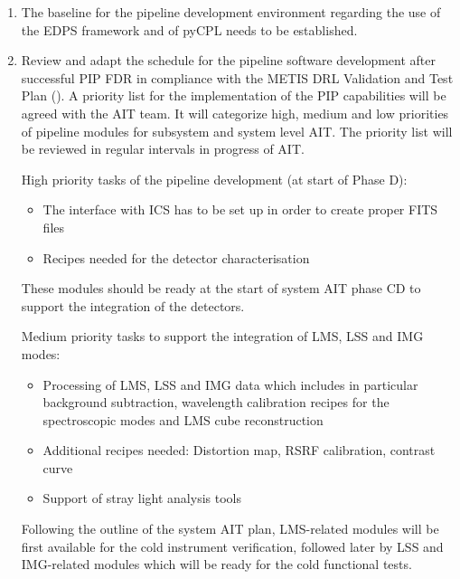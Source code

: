 \begin{enumerate}
    \item The baseline for the pipeline development environment regarding the use of the \ac{EDPS} framework and of pyCPL needs to be established.
    
    \item Review and adapt the schedule for the pipeline software development after successful PIP FDR in compliance with the METIS DRL Validation and Test Plan (\cite{DRLVT}). A priority list for the implementation of the PIP capabilities will be agreed with the AIT team. It will categorize high, medium and low priorities of pipeline modules for subsystem and system level AIT. The priority list will be reviewed in regular intervals in progress of AIT.
   
    High priority tasks of the pipeline development (at start of Phase D): 
    \begin{itemize}
        \item The interface with ICS has to be set up in order to create proper FITS files 
        \item Recipes needed for the detector characterisation
    \end{itemize} 
    These modules should be ready at the start of system AIT phase CD to support the integration of the detectors.
    
    Medium priority tasks to support the integration of \ac{LMS}, \ac{LSS} and \ac{IMG} modes:
    \begin{itemize}
        \item Processing of LMS, LSS and IMG data which includes in particular background subtraction, wavelength calibration recipes for the spectroscopic modes and LMS cube reconstruction
        \item Additional recipes needed: Distortion map, RSRF calibration, contrast curve
        \item Support of stray light analysis tools
    \end{itemize}
    Following the outline of the system AIT plan, LMS-related modules will be first available for the cold instrument verification, followed later by LSS and IMG-related modules which will be ready for the cold functional tests.


\end{enumerate}

